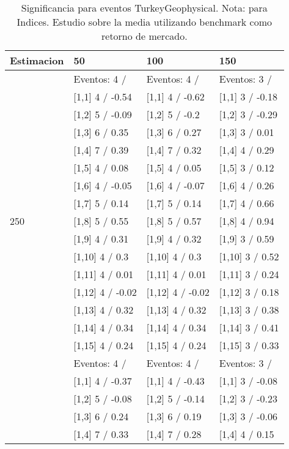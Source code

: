 \begin{table}

\caption{Significancia para eventos TurkeyGeophysical. Nota: para Indices. Estudio sobre la media utilizando benchmark como retorno de mercado.}
\centering
\begin{tabular}[t]{llll}
\toprule
Estimacion & 50 & 100 & 150\\
\midrule
 & Eventos:  4 / & Eventos:  4 / & Eventos:  3 /\\
 & {}[1,1] 4  / -0.54 & {}[1,1] 4  / -0.62 & {}[1,1] 3  / -0.18\\
 & {}[1,2] 5  / -0.09 & {}[1,2] 5  / -0.2 & {}[1,2] 3  / -0.29\\
 & {}[1,3] 6  / 0.35 & {}[1,3] 6  / 0.27 & {}[1,3] 3  / 0.01\\
 & {}[1,4] 7  / 0.39 & {}[1,4] 7  / 0.32 & {}[1,4] 4  / 0.29\\
\addlinespace
 & {}[1,5] 4  / 0.08 & {}[1,5] 4  / 0.05 & {}[1,5] 3  / 0.12\\
 & {}[1,6] 4  / -0.05 & {}[1,6] 4  / -0.07 & {}[1,6] 4  / 0.26\\
 & {}[1,7] 5  / 0.14 & {}[1,7] 5  / 0.14 & {}[1,7] 4  / 0.66\\
250 & {}[1,8] 5  / 0.55 & {}[1,8] 5  / 0.57 & {}[1,8] 4  / 0.94\\
 & {}[1,9] 4  / 0.31 & {}[1,9] 4  / 0.32 & {}[1,9] 3  / 0.59\\
\addlinespace
 & {}[1,10] 4  / 0.3 & {}[1,10] 4  / 0.3 & {}[1,10] 3  / 0.52\\
 & {}[1,11] 4  / 0.01 & {}[1,11] 4  / 0.01 & {}[1,11] 3  / 0.24\\
 & {}[1,12] 4  / -0.02 & {}[1,12] 4  / -0.02 & {}[1,12] 3  / 0.18\\
 & {}[1,13] 4  / 0.32 & {}[1,13] 4  / 0.32 & {}[1,13] 3  / 0.38\\
 & {}[1,14] 4  / 0.34 & {}[1,14] 4  / 0.34 & {}[1,14] 3  / 0.41\\
\addlinespace
 & {}[1,15] 4  / 0.24 & {}[1,15] 4  / 0.24 & {}[1,15] 3  / 0.33\\
 & Eventos:  4 / & Eventos:  4 / & Eventos:  3 /\\
 & {}[1,1] 4  / -0.37 & {}[1,1] 4  / -0.43 & {}[1,1] 3  / -0.08\\
 & {}[1,2] 5  / -0.08 & {}[1,2] 5  / -0.14 & {}[1,2] 3  / -0.23\\
 & {}[1,3] 6  / 0.24 & {}[1,3] 6  / 0.19 & {}[1,3] 3  / -0.06\\
\addlinespace
 & {}[1,4] 7  / 0.33 & {}[1,4] 7  / 0.28 & {}[1,4] 4  / 0.15\\

\end{tabular}
\end{table}
